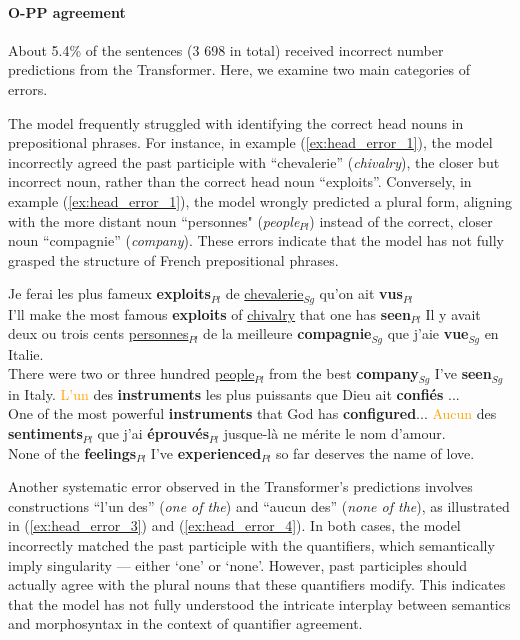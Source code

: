 \paragraph{O-PP agreement} About 5.4\% of the sentences (3 698 in total) received incorrect number predictions from the Transformer. Here, we examine two main categories of errors.

The model frequently struggled with identifying the correct head nouns in prepositional phrases. For instance, in example (\ref{ex:head_error_1}), the model incorrectly agreed the past participle with ``chevalerie'' (\textit{chivalry}), the closer but incorrect noun, rather than the correct head noun ``exploits''. Conversely, in example (\ref{ex:head_error_1}), the model wrongly predicted a plural form, aligning with the more distant noun ``personnes" (\textit{people}$_{Pl}$) instead of the correct, closer noun ``compagnie'' (\textit{company}). These errors indicate that the model has not fully grasped the structure of French prepositional phrases.

\begin{exe}
    \ex \label{ex:head_error_1} Je ferai les plus fameux \textbf{exploits}$_{Pl}$ de \underline{chevalerie}$_{Sg}$ qu'on ait \textbf{vus}$_{Pl}$ \\
    {\fontsize{11}{11}\selectfont I'll make the most famous \textbf{exploits} of \underline{chivalry} that one has \textbf{seen}$_{Pl}$ }
    \ex \label{ex:head_error_2} Il y avait deux ou trois cents \underline{personnes}$_{Pl}$ de la meilleure \textbf{compagnie}$_{Sg}$ que j'aie \textbf{vue}$_{Sg}$ en Italie. \\
    {\fontsize{11}{11}\selectfont There were two or three hundred \underline{people}$_{Pl}$ from the best \textbf{company}$_{Sg}$ I've \textbf{seen}$_{Sg}$ in Italy.}
    \ex \label{ex:head_error_3} \textcolor{orange}{L'un} des \textbf{instruments} les plus puissants que Dieu ait \textbf{confiés} ... \\
    {\fontsize{11}{11}\selectfont One of the most powerful \textbf{instruments} that God has \textbf{configured}...}
    \ex \label{ex:head_error_4} \textcolor{orange}{Aucun} des \textbf{sentiments}$_{Pl}$ que j'ai \textbf{éprouvés}$_{Pl}$ jusque-là ne mérite le nom d'amour. \\
    {\fontsize{11}{11}\selectfont None of the \textbf{feelings}$_{Pl}$ I've \textbf{experienced}$_{Pl}$ so far deserves the name of love.}

\end{exe}
\noindent Another systematic error observed in the Transformer's predictions involves constructions ``l'un des'' (\textit{one of the}) and ``aucun des'' (\textit{none of the}), as illustrated in (\ref{ex:head_error_3}) and (\ref{ex:head_error_4}). In both cases, the model incorrectly matched the past participle with the quantifiers, which semantically imply singularity --- either `one' or `none'. However, past participles should actually agree with the plural nouns that these quantifiers modify. This indicates that the model has not fully understood the intricate interplay between semantics and morphosyntax in the context of quantifier agreement.


